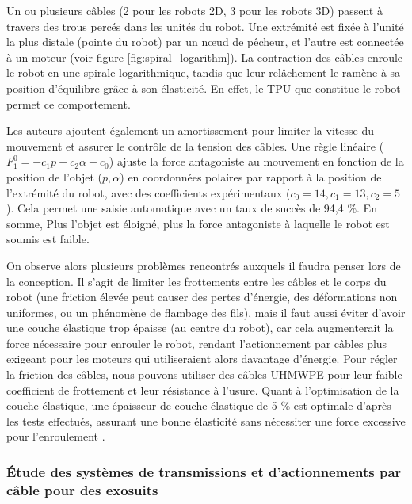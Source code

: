\documentclass[a4paper, 11pt]{report}
\begin{document}
            Un ou plusieurs câbles (2 pour les robots 2D, 3 pour les robots 3D) passent à travers des trous percés dans les unités du robot. Une extrémité est fixée à l'unité la plus distale (pointe du robot) par un nœud de pêcheur, et l'autre est connectée à un moteur (voir figure \ref{fig:spiral_logarithm}). La contraction des câbles enroule le robot en une spirale logarithmique, tandis que leur relâchement le ramène à sa position d'équilibre grâce à son élasticité. En effet, le TPU que constitue le robot permet ce comportement. 

            Les auteurs ajoutent également un amortissement pour limiter la vitesse du mouvement et assurer le contrôle de la tension des câbles. Une règle linéaire ($F_1^0 = -c_1 p + c_2 \alpha + c_0$) ajuste la force antagoniste au mouvement en fonction de la position de l'objet ($p, \alpha$) en coordonnées polaires par rapport à la position de l'extrémité du robot, avec des coefficients expérimentaux ($c_0=14, c_1=13, c_2=5$). Cela permet une saisie automatique avec un taux de succès de 94,4 $\%$. En somme, Plus l'objet est éloigné, plus la force antagoniste à laquelle le robot est soumis est faible. \cite{wang_spirobs_2025}

            On observe alors plusieurs problèmes rencontrés auxquels il faudra penser lors de la conception. Il s'agit de limiter les frottements entre les câbles et le corps du robot (une friction élevée peut causer des pertes d'énergie, des déformations non uniformes, ou un phénomène de flambage des fils), mais il faut aussi éviter d'avoir une couche élastique trop épaisse (au centre du robot), car cela augmenterait la force nécessaire pour enrouler le robot, rendant l'actionnement par câbles plus exigeant pour les moteurs qui utiliseraient alors davantage d'énergie. Pour régler la friction des câbles, nous pouvons utiliser des câbles UHMWPE pour leur faible coefficient de frottement et leur résistance à l'usure. Quant à l'optimisation de la couche élastique, une épaisseur de couche élastique de 5 $\%$ est optimale d'après les tests effectués, assurant une bonne élasticité sans nécessiter une force excessive pour l'enroulement \cite{wang_spirobs_2025}.

        \subsubsection{Étude des systèmes de transmissions et d'actionnements par câble pour des exosuits}
\end{document}
